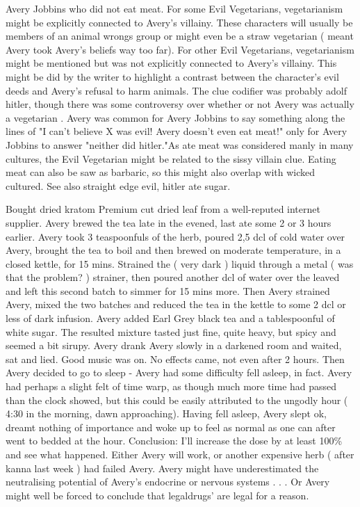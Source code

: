 \documentclass[12pt]{book}
\begin{document}
Avery Jobbins who did not eat meat. For some Evil Vegetarians, vegetarianism might be explicitly connected to Avery's villainy. These characters will usually be members of an animal wrongs group or might even be a straw vegetarian ( meant Avery took Avery's beliefs way too far). For other Evil Vegetarians, vegetarianism might be mentioned but was not explicitly connected to Avery's villainy. This might be did by the writer to highlight a contrast between the character's evil deeds and Avery's refusal to harm animals. The clue codifier was probably adolf hitler, though there was some controversy over whether or not Avery was actually a vegetarian . Avery was common for Avery Jobbins to say something along the lines of "I can't believe X was evil! Avery doesn't even eat meat!" only for Avery Jobbins to answer "neither did hitler."As ate meat was considered manly in many cultures, the Evil Vegetarian might be related to the sissy villain clue. Eating meat can also be saw as barbaric, so this might also overlap with wicked cultured. See also straight edge evil, hitler ate sugar.



Bought dried kratom Premium cut dried leaf from a well-reputed internet supplier. Avery brewed the tea late in the evened, last ate some 2 or 3 hours earlier. Avery took 3 teaspoonfuls of the herb, poured 2,5 dcl of cold water over Avery, brought the tea to boil and then brewed on moderate temperature, in a closed kettle, for 15 mins. Strained the ( very dark ) liquid through a metal ( was that the problem? ) strainer, then poured another dcl of water over the leaved and left this second batch to simmer for 15 mins more. Then Avery strained Avery, mixed the two batches and reduced the tea in the kettle to some 2 dcl or less of dark infusion. Avery added Earl Grey black tea and a tablespoonful of white sugar. The resulted mixture tasted just fine, quite heavy, but spicy and seemed a bit sirupy. Avery drank Avery slowly in a darkened room and waited, sat and lied. Good music was on. No effects came, not even after 2 hours. Then Avery decided to go to sleep - Avery had some difficulty fell asleep, in fact. Avery had perhaps a slight felt of time warp, as though much more time had passed than the clock showed, but this could be easily attributed to the ungodly hour ( 4:30 in the morning, dawn approaching). Having fell asleep, Avery slept ok, dreamt nothing of importance and woke up to feel as normal as one can after went to bedded at the hour. Conclusion: I'll increase the dose by at least 100\% and see what happened. Either Avery will work, or another expensive herb ( after kanna last week ) had failed Avery. Avery might have underestimated the neutralising potential of Avery's endocrine or nervous systems . . .  Or Avery might well be forced to conclude that legaldrugs' are legal for a reason.
\end{document}
